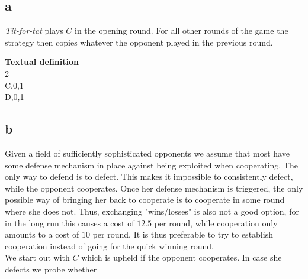 \documentclass[10pt,a4paper]{article}
\begin{document}
\subsection*{a}
\textit{Tit-for-tat} plays $C$ in the opening round. For all other rounds of the game the strategy then copies whatever the opponent played in the previous round.

\textbf{Textual definition}\\
2\\
C,0,1\\
D,0,1
\subsection*{b}
Given a field of sufficiently sophisticated opponents we assume that most have some defense mechanism in place against being exploited when cooperating. The only way to defend is to defect. This makes it impossible to consistently defect, while the opponent cooperates. Once her defense mechanism is triggered, the only possible way of bringing her back to cooperate is to cooperate in some round where she does not. Thus, exchanging "wins/losses" is also not a good option, for in the long run this causes a cost of $12.5$ per round, while cooperation only amounts to a cost of $10$ per round. It is thus preferable to try to establish cooperation instead of going for the quick winning round.\\
We start out with $C$ which is upheld if the opponent cooperates. In case she defects we probe whether 
\end{document}
